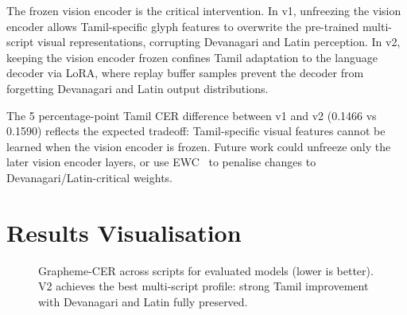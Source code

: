 \documentclass[11pt,a4paper]{article}
\begin{document}
The frozen vision encoder is the critical intervention.
In v1, unfreezing the vision encoder allows Tamil-specific glyph features to
overwrite the pre-trained multi-script visual representations, corrupting
Devanagari and Latin perception.
In v2, keeping the vision encoder frozen confines Tamil adaptation to the
language decoder via LoRA, where replay buffer samples prevent the decoder
from forgetting Devanagari and Latin output distributions.

The 5 percentage-point Tamil CER difference between v1 and v2 (0.1466 vs 0.1590)
reflects the expected tradeoff: Tamil-specific visual features cannot be learned
when the vision encoder is frozen.
Future work could unfreeze only the later vision encoder layers, or use
EWC~\citep{kirkpatrick2017ewc} to penalise changes to Devanagari/Latin-critical
weights.

\section{Results Visualisation}

\begin{figure}[h]
\centering
{}
\caption{Grapheme-CER across scripts for evaluated models (lower is better).
V2 achieves the best multi-script profile: strong Tamil improvement with
Devanagari and Latin fully preserved.}
\label{fig:cer_bar}
\end{figure}
\end{document}
